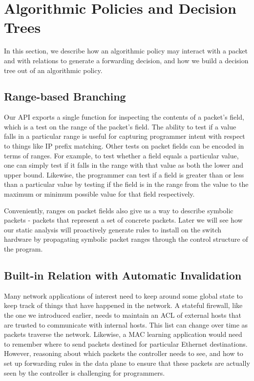 \documentclass[nocopyrightspace]{sigplanconf}
\begin{document}
\section*{Algorithmic Policies and Decision Trees}
In this section, we describe how an algorithmic policy may interact with a packet and with relations to generate a forwarding decision, and how we build a decision tree out of an algorithmic policy.

   \subsection*{Range-based Branching}
   

   Our API exports a single function for inspecting the contents of a packet's field, which is a test on the range of the packet's field. The ability to test if a value falls in a particular range is useful for capturing programmer intent with respect to things like IP prefix matching. Other tests on packet fields can be encoded in terms of ranges. For example, to test whether a field equals a particular value, one can simply test if it falls in the range with that value as both the lower and upper bound. Likewise, the programmer can test if a field is greater than or less than a particular value by testing if the field is in the range from the value to the maximum or minimum possible value for that field respectively. 
   
Conveniently, ranges on packet fields also give us a way to describe symbolic packets - packets that represent a set of concrete packets. Later we will see how our static analysis will proactively generate rules to install on the switch hardware by propagating symbolic packet ranges through the control structure of the program.



     \subsection*{Built-in Relation with Automatic Invalidation}
	Many network applications of interest need to keep around some global state to keep track of things that have happened in the network. A stateful firewall, like the one we introduced earlier, needs to maintain an ACL of external hosts that are trusted to communicate with internal hosts. This list can change over time as packets traverse the network. Likewise, a MAC learning application would need to remember where to send packets destined for particular Ethernet destinations. However, reasoning about which packets the controller needs to see, and how to set up forwarding rules in the data plane to ensure that these packets are actually seen by the controller is challenging for programmers.
	
\end{document}
